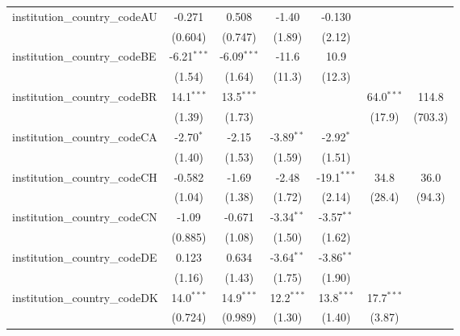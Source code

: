 \begin{tabular}{lcccccc}
   institution\_country\_codeAU          & -0.271        & 0.508         & -1.40         & -0.130        &              &   \\   
                                         & (0.604)       & (0.747)       & (1.89)        & (2.12)        &              &   \\   
   institution\_country\_codeBE          & -6.21$^{***}$ & -6.09$^{***}$ & -11.6         & 10.9          &              &   \\   
                                         & (1.54)        & (1.64)        & (11.3)        & (12.3)        &              &   \\   
   institution\_country\_codeBR          & 14.1$^{***}$  & 13.5$^{***}$  &               &               & 64.0$^{***}$ & 114.8\\   
                                         & (1.39)        & (1.73)        &               &               & (17.9)       & (703.3)\\   
   institution\_country\_codeCA          & -2.70$^{*}$   & -2.15         & -3.89$^{**}$  & -2.92$^{*}$   &              &   \\   
                                         & (1.40)        & (1.53)        & (1.59)        & (1.51)        &              &   \\   
   institution\_country\_codeCH          & -0.582        & -1.69         & -2.48         & -19.1$^{***}$ & 34.8         & 36.0\\   
                                         & (1.04)        & (1.38)        & (1.72)        & (2.14)        & (28.4)       & (94.3)\\   
   institution\_country\_codeCN          & -1.09         & -0.671        & -3.34$^{**}$  & -3.57$^{**}$  &              &   \\   
                                         & (0.885)       & (1.08)        & (1.50)        & (1.62)        &              &   \\   
   institution\_country\_codeDE          & 0.123         & 0.634         & -3.64$^{**}$  & -3.86$^{**}$  &              &   \\   
                                         & (1.16)        & (1.43)        & (1.75)        & (1.90)        &              &   \\   
   institution\_country\_codeDK          & 14.0$^{***}$  & 14.9$^{***}$  & 12.2$^{***}$  & 13.8$^{***}$  & 17.7$^{***}$ &   \\   
                                         & (0.724)       & (0.989)       & (1.30)        & (1.40)        & (3.87)       &   \\   

\end{tabular}
